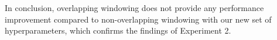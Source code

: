 In conclusion, overlapping windowing does not provide any performance improvement compared to non-overlapping windowing with our new set of hyperparameters, which confirms the findings of Experiment 2.

\begin{figure}[htp]
  \centering
  \quad
   

\end{figure}
